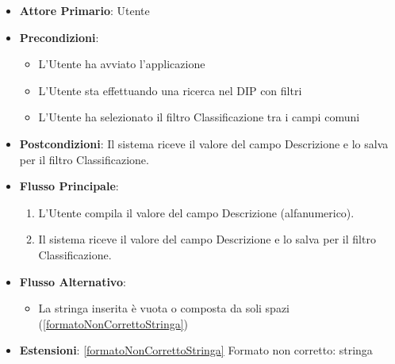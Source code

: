 \begin{itemize}
      \item \textbf{Attore Primario}: Utente
      \item \textbf{Precondizioni}:
      \begin{itemize}
            \item L'Utente ha avviato l'applicazione
            \item L'Utente sta effettuando una ricerca nel DIP con filtri
            \item L'Utente ha selezionato il filtro Classificazione tra i campi comuni
      \end{itemize}
      \item \textbf{Postcondizioni}: Il sistema riceve il valore del campo Descrizione e lo salva per il filtro Classificazione.
      \item \textbf{Flusso Principale}:
      \begin{enumerate}
            \item L'Utente compila il valore del campo Descrizione (alfanumerico).
            \item Il sistema riceve il valore del campo Descrizione e lo salva per il filtro Classificazione.
      \end{enumerate}
      \item \textbf{Flusso Alternativo}:
      \begin{itemize}
            \item La stringa inserita è vuota o composta da soli spazi (\ref{formatoNonCorrettoStringa})
      \end{itemize}
      \item \textbf{Estensioni}: \ref{formatoNonCorrettoStringa} Formato non corretto: stringa
\end{itemize}

